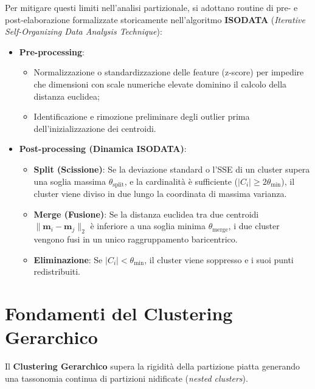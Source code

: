 Per mitigare questi limiti nell'analisi partizionale, si adottano routine di pre- e post-elaborazione formalizzate storicamente nell'algoritmo \textbf{ISODATA} (\textit{Iterative Self-Organizing Data Analysis Technique}):
\begin{itemize}
    \item \textbf{Pre-processing}:
    \begin{itemize}[noitemsep]
        \item Normalizzazione o standardizzazione delle feature (z-score) per impedire che dimensioni con scale numeriche elevate dominino il calcolo della distanza euclidea;
        \item Identificazione e rimozione preliminare degli outlier prima dell'inizializzazione dei centroidi.
    \end{itemize}
    \item \textbf{Post-processing (Dinamica ISODATA)}:
    \begin{itemize}[noitemsep]
        \item \textbf{Split (Scissione)}: Se la deviazione standard o l'SSE di un cluster supera una soglia massima $\theta_{\text{split}}$, e la cardinalità è sufficiente ($|C_i| \ge 2\theta_{\min}$), il cluster viene diviso in due lungo la coordinata di massima varianza.
        \item \textbf{Merge (Fusione)}: Se la distanza euclidea tra due centroidi $\|\mathbf{m}_i - \mathbf{m}_j\|_2$ è inferiore a una soglia minima $\theta_{\text{merge}}$, i due cluster vengono fusi in un unico raggruppamento baricentrico.
        \item \textbf{Eliminazione}: Se $|C_i| < \theta_{\min}$, il cluster viene soppresso e i suoi punti redistribuiti.
    \end{itemize}
\end{itemize}

\section{Fondamenti del Clustering Gerarchico}
\label{sec:dm-hierarchical-foundations-dendrogram}

Il \textbf{Clustering Gerarchico} supera la rigidità della partizione piatta generando una tassonomia continua di partizioni nidificate (\textit{nested clusters}).

